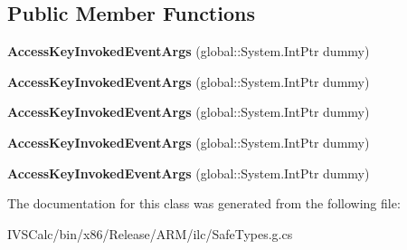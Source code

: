 \subsection*{Public Member Functions}
\begin{DoxyCompactItemize}
\item 
\mbox{\label{class_windows_1_1_u_i_1_1_xaml_1_1_input_1_1_access_key_invoked_event_args_a5cab6674e52266e98e319eedf46992ac}} 
{\bfseries Access\+Key\+Invoked\+Event\+Args} (global\+::\+System.\+Int\+Ptr dummy)
\item 
\mbox{\label{class_windows_1_1_u_i_1_1_xaml_1_1_input_1_1_access_key_invoked_event_args_a5cab6674e52266e98e319eedf46992ac}} 
{\bfseries Access\+Key\+Invoked\+Event\+Args} (global\+::\+System.\+Int\+Ptr dummy)
\item 
\mbox{\label{class_windows_1_1_u_i_1_1_xaml_1_1_input_1_1_access_key_invoked_event_args_a5cab6674e52266e98e319eedf46992ac}} 
{\bfseries Access\+Key\+Invoked\+Event\+Args} (global\+::\+System.\+Int\+Ptr dummy)
\item 
\mbox{\label{class_windows_1_1_u_i_1_1_xaml_1_1_input_1_1_access_key_invoked_event_args_a5cab6674e52266e98e319eedf46992ac}} 
{\bfseries Access\+Key\+Invoked\+Event\+Args} (global\+::\+System.\+Int\+Ptr dummy)
\item 
\mbox{\label{class_windows_1_1_u_i_1_1_xaml_1_1_input_1_1_access_key_invoked_event_args_a5cab6674e52266e98e319eedf46992ac}} 
{\bfseries Access\+Key\+Invoked\+Event\+Args} (global\+::\+System.\+Int\+Ptr dummy)
\end{DoxyCompactItemize}


The documentation for this class was generated from the following file\+:\begin{DoxyCompactItemize}
\item 
I\+V\+S\+Calc/bin/x86/\+Release/\+A\+R\+M/ilc/Safe\+Types.\+g.\+cs\end{DoxyCompactItemize}
